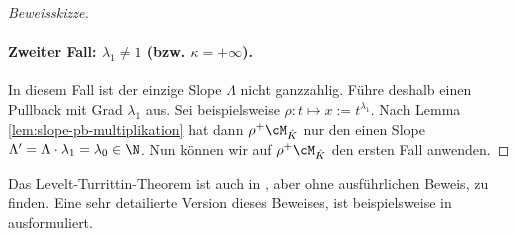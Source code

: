 \begin{proof}[Beweisskizze]
\paragraph{Zweiter Fall: $\lambda_1\neq1$ (bzw. $\kappa = +\infty$).} 
In diesem Fall ist der einzige Slope $\Lambda$ nicht ganzzahlig. Führe deshalb
einen Pullback mit Grad $\lambda_1$ aus.
Sei beispielsweise $\rho:t\mapsto x:=t^{\lambda_1}$.
Nach Lemma \ref{lem:slope-pb-multiplikation} hat dann $\rho^+\cM_{\hat K}$ nur
den einen Slope $\Lambda'=\Lambda\cdot\lambda_1=\lambda_0\in\N$. Nun können wir
auf $\rho^+\cM_{\hat K}$ den ersten Fall anwenden.
\begin{comment}
Damit können wir nun die zugehörige Linearform $\ell':=\lambda_0s_0+s_1$
definieren. Es gilt dass
\[
\sigma_{\ell'}(P')=\dots
\]
ist, welches zumindest zwei unterschiedliche Nullstellen hat. Nun wendet man
den zweiten Unterfall des ersten Fall an.
\end{comment}
\end{proof} %
\begin{bem}
Das Levelt-Turrittin-Theorem ist auch in \cite[Thm 5.4.7]{sabbah_cimpa90}, aber
ohne ausführlichen Beweis, zu finden.
Eine sehr detailierte Version dieses Beweises, ist beispielsweise in \cite[Thm
5.16]{DiplHedwig} ausformuliert.
\end{bem}

\begin{comment}
\begin{prop}
\cite[Prop 3.1]{sabbah_Fourier-local}
Jeder irreduzible endlich dimensionale formale meromorphe Zusammenhang
$\cM_{\hat L}$ ist isomorph zu $\rho_+(\sE^\phi\otimes_{\hat K} S)$, wobei
$\phi\in x^{-1}\C[x^-1]$, $\rho:x\mapsto t=x^p$ mit grad $p\geq1$ minimal bzgl.
$\phi$ (siehe \cite[Rem 2.8]{sabbah_Fourier-local}), und $S$ ist ein Rang $1$
$\hat K$-Vektor Raum mit regulärem Zusammenhang.
\end{prop}
\begin{proof}
\cite[Prop 3.1]{sabbah_Fourier-local}
\end{proof}

\begin{thm}[Refined Turrittin-Levelt]
\cite[Cor 3.3]{sabbah_Fourier-local}
Jeder endlich dimensionale meromorphe Zusammenhang $\cM_{\hat K}$ kann in
eindutiger weiße geschrieben werden als direkte Summe $\bigoplus
El(\rho,\phi,R)\bydef\bigoplus\rho_+(\sE^\phi)\otimes R$, so dass
jedes $\rho_+\sE^\phi$ irreduzibel ist und keine zwei $\rho_+\sE^\phi$ isomorph
sind.
\end{thm}
\begin{proof}
\cite[Cor 3.3]{sabbah_Fourier-local}
\end{proof}
\end{comment}

